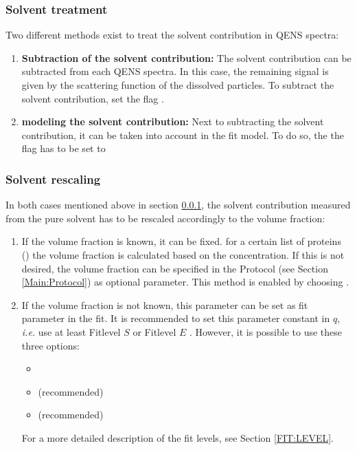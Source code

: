 \subsubsection{Solvent treatment}
\label{FIT:SOLVENT}
Two different methods exist to treat the solvent contribution in QENS spectra:
\begin{enumerate}
	\item \label{FIT:SOLVENT:Solventsubtract}{\bf Subtraction of the solvent contribution:} The solvent contribution can be subtracted from each QENS spectra. In this case, the remaining signal is given by the scattering function of the dissolved particles. To subtract the solvent contribution, set the flag . 
	\item \label{FIT:SOLVENT:Solventmodel}{\bf modeling the solvent contribution: } Next to subtracting the solvent contribution, it can be taken into account in the fit model. To do so, the the flag has to be set to 
\end{enumerate}
\subsubsection{Solvent rescaling}
\label{FIT:SOLVENT:RESCALE}
In both cases mentioned above in section \ref{FIT:SOLVENT}, the solvent contribution measured from the pure solvent has to be rescaled accordingly to the volume fraction: 
\begin{enumerate}
	\item If the volume fraction is known, it can be fixed. for a certain list of proteins () the volume fraction is calculated based on the concentration. If this is not desired, the volume fraction can be specified in the Protocol (see Section \ref{Main:Protocol}) as optional parameter. This method is enabled by choosing .
	\item If the volume fraction is not known, this parameter can be set as fit parameter in the fit. It is recommended to set this parameter constant in $q$, \textit{i.e.} use at least Fitlevel $S$  or Fitlevel $E$ . However, it is possible to use these three options:
	\begin{itemize}
		\item {}
		\item {} (recommended)
		\item {} (recommended)
	\end{itemize}
	For a more detailed description of the fit levels, see Section \ref{FIT:LEVEL}.
\end{enumerate}
